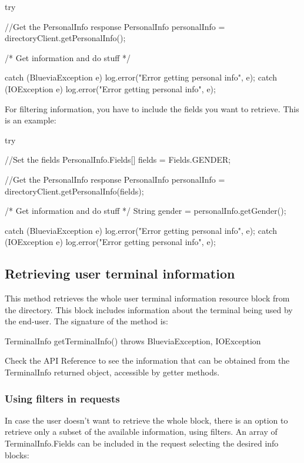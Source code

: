 \begin{DoxyCode}
try {
        //Get the PersonalInfo response
        PersonalInfo personalInfo = directoryClient.getPersonalInfo();

        /* Get information and do stuff */
          
} catch (BlueviaException e) {
        log.error("Error getting personal info", e);
} catch (IOException e) {
        log.error("Error getting personal info", e);
}
\end{DoxyCode}


For filtering information, you have to include the fields you want to retrieve. This is an example:


\begin{DoxyCode}
try {
        //Set the fields
        PersonalInfo.Fields[] fields = {Fields.GENDER};
        
        //Get the PersonalInfo response
        PersonalInfo personalInfo = directoryClient.getPersonalInfo(fields);

        /* Get information and do stuff */
        String gender = personalInfo.getGender();
          
} catch (BlueviaException e) {
        log.error("Error getting personal info", e);
} catch (IOException e) {
        log.error("Error getting personal info", e);
}
\end{DoxyCode}
\hypertarget{blv_directory_guide_retrieving_user_terminal_info_sec}{}\subsection{Retrieving user terminal information}\label{blv_directory_guide_retrieving_user_terminal_info_sec}
This method retrieves the whole user terminal information resource block from the directory. This block includes information about the terminal being used by the end-\/user. The signature of the method is:


\begin{DoxyCode}
TerminalInfo getTerminalInfo() throws BlueviaException, IOException
\end{DoxyCode}


Check the API Reference to see the information that can be obtained from the TerminalInfo returned object, accessible by getter methods.\hypertarget{blv_directory_guide_user_terminal_info_using_filters_sec}{}\subsubsection{Using filters in requests}\label{blv_directory_guide_user_terminal_info_using_filters_sec}
In case the user doesn't want to retrieve the whole block, there is an option to retrieve only a subset of the available information, using filters. An array of TerminalInfo.Fields can be included in the request selecting the desired info blocks:


